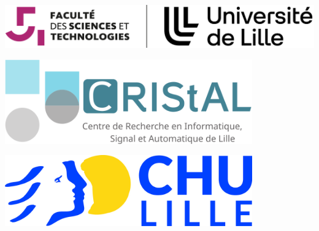 \begin{titlepage}
    \begin{minipage}{0.30\textwidth}
        \centering
        \includegraphics[width=1\textwidth]{images/logo_fst_ulille_cropped.png}
    \end{minipage}
    \hfill
    \begin{minipage}{0.30\textwidth}
        \centering
        \includegraphics[width=0.8\textwidth]{images/logo_cristal.png}
    \end{minipage}
    \hfill
    \begin{minipage}{0.30\textwidth}
        \centering
        \includegraphics[width=0.8\textwidth]{images/logo_chu.jpg}
    \end{minipage}

\end{titlepage}
